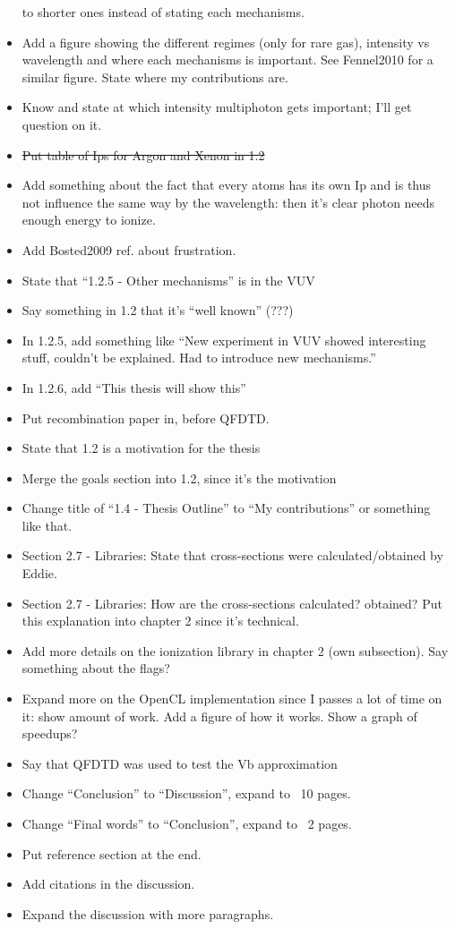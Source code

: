 \begin{itemize}
to shorter ones instead of stating each mechanisms.
\item Add a figure showing the different regimes (only for rare gas), intensity
vs wavelength and where each mechanisms is important. See Fennel2010 for a
similar figure. State where my contributions are.
\item Know and state at which intensity multiphoton gets important; I'll get
question on it.
\item \sout{Put table of Ips for Argon and Xenon in 1.2}
\item Add something about the fact that every atoms has its own Ip and is thus
not influence the same way by the wavelength: then it's clear photon needs
enough energy to ionize.
\item Add Bosted2009 ref. about frustration.
\item State that ``1.2.5 - Other mechanisms'' is in the VUV
\item Say something in 1.2 that it's ``well known'' (???)
\item In 1.2.5, add something like ``New experiment in VUV showed interesting
stuff, couldn't be explained. Had to introduce new mechanisms.''
\item In 1.2.6, add ``This thesis will show this''
\item Put recombination paper in, before QFDTD.
\item State that 1.2 is a motivation for the thesis
\item Merge the goals section into 1.2, since it's the motivation
\item Change title of ``1.4 - Thesis Outline'' to ``My contributions'' or
something like that.
\item Section 2.7 - Libraries: State that cross-sections were calculated/obtained
by Eddie.
\item Section 2.7 - Libraries: How are the cross-sections calculated? obtained?
Put this explanation into chapter 2 since it's technical.
\item Add more details on the ionization library in chapter 2 (own subsection).
Say something about the flags?
\item Expand more on the OpenCL implementation since I passes a lot of time on
it: show amount of work. Add a figure of how it works. Show a graph of speedups?
\item Say that QFDTD was used to test the Vb approximation
\item Change ``Conclusion'' to ``Discussion'', expand to ~10 pages.
\item Change ``Final words'' to ``Conclusion'', expand to ~2 pages.
\item Put reference section at the end.
\item Add citations in the discussion.
\item Expand the discussion with more paragraphs.
\end{itemize}
